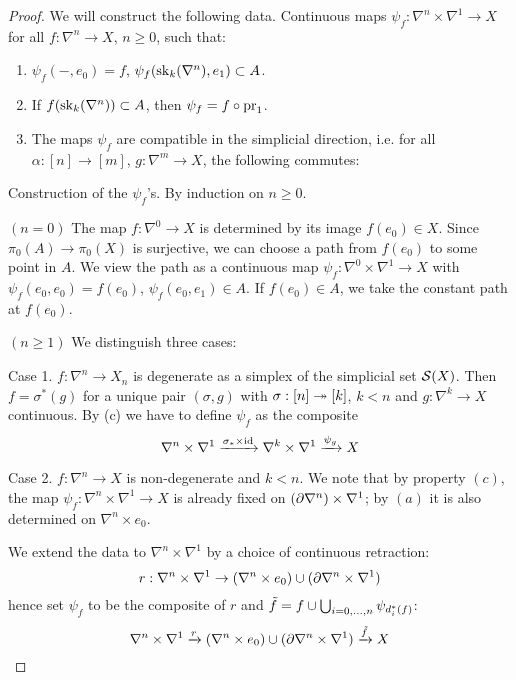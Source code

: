 \begin{proof}
We will construct the following data. Continuous maps $\psi_f:\nabla^n\times\nabla^1\to X$ for all $f:\nabla^n\to X$, $n\geq 0$, such that:
\begin{enumerate}[label={(\alph*)}]
    \item $\psi_f(-,e_0)=f$, $\psi_f(\sk_k(\ns),e_1)\subset A$.
    \item If $f(\sk_k(\ns))\subset A$, then $\psi_f=f\circ\pr_1$.
    \item The maps $\psi_f$ are compatible in the simplicial direction, i.e. for all $\alpha:[n]\to[m]$, $g:\nabla^m\to X$, the following commutes:
    \begin{center}
    \end{center}
\end{enumerate}

Construction of the $\psi_f$'s. By induction on $n\geq0$.

$(n=0)$ The map $f:\nabla^0\to X$ is determined by its image $f(e_0)\in X$. Since $\pi_0(A)\to\pi_0(X)$ is surjective, we can choose a path from $f(e_0)$ to some point in $A$. We view the path as a continuous map $\psi_f:\nabla^0\times\nabla^1\to X$ with $\psi_f(e_0,e_0)=f(e_0)$, $\psi_f(e_0,e_1)\in A$. If $f(e_0)\in A$, we take the constant path at $f(e_0)$.

$(n\geq1)$ We distinguish three cases:

Case 1. $f:\nabla^n\to X_n$ is degenerate as a simplex of the simplicial set $\S(X)$. Then $f=\sigma^*(g)$ for a unique pair $(\sigma,g)$ with $\sigma:[n]\onto[k]$, $k<n$ and $g:\nabla^k\to X$ continuous. By (c) we have to define $\psi_f$ as the composite
\[\nabla^n\times\nabla^1\xto{\sigma_*\times\id}\nabla^k\times\nabla^1\xto{\psi_g} X\]

Case 2. $f:\nabla^n\to X$ is non-degenerate and $k<n$. We note that by property $(c)$, the map $\psi_f:\nabla^n\times\nabla^1\to X$ is already fixed on $(\de\nabla^n)\times\nabla^1$; by $(a)$ it is also determined on $\nabla^n\times e_0$.

We extend the data to $\nabla^n\times\nabla^1$ by a choice of continuous retraction:
\[r:\nabla^n\times\nabla^1\to (\nabla^n\times e_0)\cup(\de\nabla^n\times\nabla^1)\]
hence set $\psi_f$ to be the composite of $r$ and $\til f=f\cup\bigcup_{i=0,\dots,n}\psi_{d_i^*(f)}$\normalmarginpar{}:
\[\ns\times\sx{1}\xto{r}(\nabla^n\times e_0)\cup(\de\nabla^n\times\nabla^1)\xto{\til f} X\]


\end{proof}
